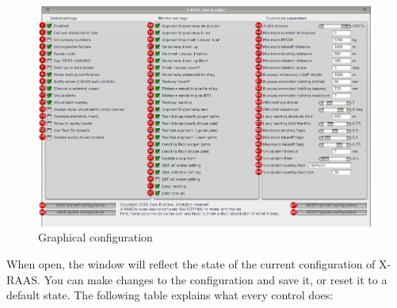 \documentclass[a4paper,12pt]{article}
\begin{document}
\begin{figure}[H]
\vspace{.5em}
\begin{center}
\includegraphics[width=\textwidth]{../src/config_window_annotated.png}
\end{center}
\caption{Graphical configuration}
\label{GUIConfigurationWindow}
\end{figure}

When open, the window will reflect the state of the current configuration
of X-RAAS. You can make changes to the configuration and save it, or
reset it to a default state. The following table explains what every
control does:

\newcommand{\guiconfbtn}[1]{#1\label{gui_conf_btn_label_#1}}
\end{document}
